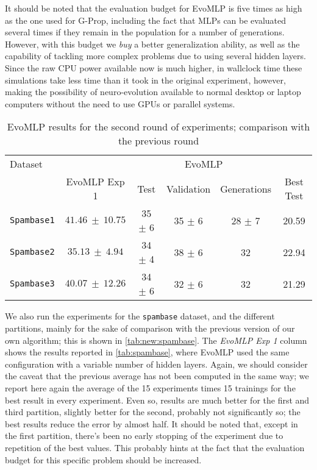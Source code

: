 \documentclass[conference]{IEEEtran}\usepackage[]{graphicx}\usepackage[]{color}
\begin{document}
It should be noted that the evaluation budget for EvoMLP is five times as high as the one used for G-Prop, including the fact that MLPs can be evaluated several times if they remain in the population for a number of generations. However, with this budget we {\em buy} a better generalization ability, as well as the capability of tackling more complex problems due to using several hidden layers. Since the raw CPU power available now is much higher, in wallclock time these simulations take less time than it took in the original experiment, however, making the possibility of neuro-evolution available to normal desktop or laptop computers without the need to use GPUs or parallel systems.

\begin{table*}[h!tbp]
  \centering
  \caption{{\sf EvoMLP} results for the second round of experiments;
    comparison with the previous round}
  \label{tab:new:spambase}
  \begin{tabular}{|l|c|c|c|c|c|}
    \hline
    Dataset &        & \multicolumn{3}{|c|}{EvoMLP} & \\
            & EvoMLP Exp 1 & Test & Validation & Generations & Best Test\\ \hline
        \texttt{Spambase1}   & $41.46\ \pm\ 10.75$ &  35 $\pm$ 6 & 35 $\pm$ 6 & 28 $\pm$ 7 & 20.59 \\ \hline
        \texttt{Spambase2}   & $35.13\ \pm\ 4.94$ & 34 $\pm$ 4 & 38 $\pm$ 6 & 32 & 22.94 \\ \hline
        \texttt{Spambase3}   & $40.07\ \pm\ 12.26$ & 34 $\pm$ 6 & 32 $\pm$ 6 & 32 & 21.29 \\ \hline
  \end{tabular}
\end{table*}
%
We also run the experiments for the {\tt spambase} dataset, and the different partitions, mainly for the sake of comparison with the previous version of our own algorithm; this is shown in \autoref{tab:new:spambase}. The {\em EvoMLP Exp 1} column shows the results reported in \autoref{tab:spambase}, where EvoMLP used the same configuration with a variable number of hidden layers. Again, we should consider the caveat that the previous average has not been computed in the same way; we report here again the average of the 15 experiments times 15 trainings for the best result in every experiment. Even so, results are much better for the first and third partition, slightly better for the second, probably not significantly so; the best results reduce the error by almost half. It should be noted that, except in the first partition, there's been no early stopping of the experiment due to repetition of the best values. This probably hints at the fact that the evaluation budget for this specific problem should be increased.
\end{document}

